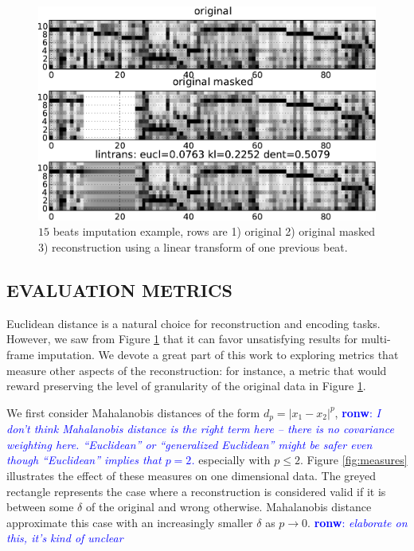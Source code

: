 \documentclass{article}
\newcommand{\FIXME}[2][FIXME]{\textcolor{blue}{\textbf{#1}: \emph{#2}}}
\begin{document}
\begin{figure}[t]
\begin{center}
\includegraphics[width=.95\columnwidth]{basic}
\end{center}
\caption{$15$ beats imputation example, rows are 1) original 2) original masked
3) reconstruction using a linear transform of one previous beat.
\label{fig:basic}}
\end{figure}



\subsection{EVALUATION METRICS}
\label{ssec:measures}
Euclidean distance is a natural choice for reconstruction and encoding
tasks. However, we saw from Figure \ref{fig:basic} that it can favor
unsatisfying results for multi-frame imputation. We devote a great
part of this work to exploring metrics that measure other aspects of
the reconstruction: for instance, a metric that would reward
preserving the level of granularity of the original data in Figure
\ref{fig:basic}.

We first consider Mahalanobis distances of the form $d_p =
|x_1-x_2|^p$,
\FIXME[ronw]{I don't think Mahalanobis distance is the right term here
  -- there is no covariance weighting here.  ``Euclidean'' or
  ``generalized Euclidean'' might be
  safer even though ``Euclidean'' implies that $p=2$.}
 especially with $p \leq 2$. Figure \ref{fig:measures}
illustrates the effect of these measures on one dimensional data.  The
greyed rectangle represents the case where a reconstruction is
considered valid if it is between some $\delta$ of the original and
wrong otherwise.  Mahalanobis distance approximate this case with an
increasingly smaller $\delta$ as $p \rightarrow 0$.
\FIXME[ronw]{elaborate on this, it's kind of unclear}
\end{document}
